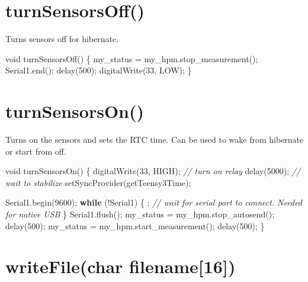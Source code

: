 \documentclass[]{book}
\newenvironment{Shaded}{\begin{snugshade}}{\end{snugshade}}
\newcommand{\CommentTok}[1]{\textcolor[rgb]{0.56,0.35,0.01}{\textit{#1}}}
\newcommand{\ControlFlowTok}[1]{\textcolor[rgb]{0.13,0.29,0.53}{\textbf{#1}}}
\newcommand{\DataTypeTok}[1]{\textcolor[rgb]{0.13,0.29,0.53}{#1}}
\newcommand{\DecValTok}[1]{\textcolor[rgb]{0.00,0.00,0.81}{#1}}
\newcommand{\NormalTok}[1]{#1}
\begin{document}
\hypertarget{turnsensorsoff}{%
\section*{turnSensorsOff()}\label{turnsensorsoff}}

Turns sensors off for hibernate.

\begin{Shaded}
\begin{Highlighting}[]
\DataTypeTok{void}\NormalTok{ turnSensorsOff() \{}
\NormalTok{  my_status = my_hpm.stop_measurement();}
\NormalTok{  Serial1.end();}
\NormalTok{  delay(}\DecValTok{500}\NormalTok{);}
\NormalTok{  digitalWrite(}\DecValTok{33}\NormalTok{, LOW);}
\NormalTok{\}}
\end{Highlighting}
\end{Shaded}

\hypertarget{turnsensorson}{%
\section*{turnSensorsOn()}\label{turnsensorson}}

Turns on the sensors and sets the RTC time. Can be used to wake from hibernate or start from off.

\begin{Shaded}
\begin{Highlighting}[]
\DataTypeTok{void}\NormalTok{ turnSensorsOn() \{}
\NormalTok{  digitalWrite(}\DecValTok{33}\NormalTok{, HIGH); }\CommentTok{// turn on relay}
\NormalTok{  delay(}\DecValTok{5000}\NormalTok{); }\CommentTok{// wait to stabilize}
\NormalTok{  setSyncProvider(getTeensy3Time);}

\NormalTok{  Serial1.begin(}\DecValTok{9600}\NormalTok{);}
  \ControlFlowTok{while}\NormalTok{ (!Serial1) \{}
\NormalTok{    ; }\CommentTok{// wait for serial port to connect. Needed for native USB}
\NormalTok{  \}}
\NormalTok{  Serial1.flush();}
\NormalTok{  my_status = my_hpm.stop_autosend();}
\NormalTok{  delay(}\DecValTok{500}\NormalTok{);}
\NormalTok{  my_status = my_hpm.start_measurement();  }
\NormalTok{  delay(}\DecValTok{500}\NormalTok{); }
\NormalTok{\}}
\end{Highlighting}
\end{Shaded}

\hypertarget{writefilechar-filename16}{%
\section*{writeFile(char filename{[}16{]})}\label{writefilechar-filename16}}
\end{document}
